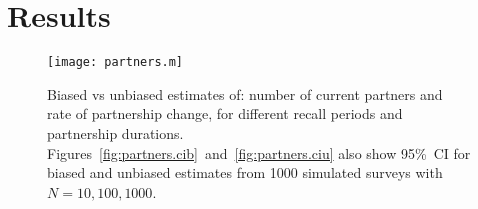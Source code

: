 \section{Results}

\newcommand{\pfigcap}{Biased vs unbiased estimates of:
  number of current partners and rate of partnership change,
  for different recall periods and partnership durations}
\newcommand{\pfigcapx}[2][Ribbons]{#1 show 95\%~CI for #2 estimates
  from 1000 simulated surveys with $N = 10, 100, 1000$.}
\begin{figure}
  \texttt{[image: partners.m]}
  \caption{\pfigcap.
    \pfigcapx[Figures~\ref{fig:partners.cib}~and~\ref{fig:partners.ciu} also]{biased and unbiased}}
  \label{fig:partners.m}
\end{figure}